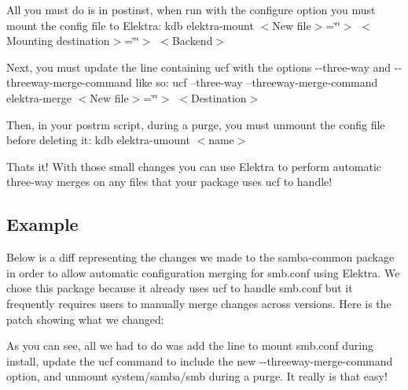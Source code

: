 All you must do is in {\ttfamily postinst}, when run with the {\ttfamily configure} option you must mount the config file to Elektra\+: kdb elektra-\/mount $<$\+New file$>$=\char`\"{}\char`\"{}$>$ $<$\+Mounting destination$>$=\char`\"{}\char`\"{}$>$ $<$\+Backend$>$

Next, you must update the line containing {\ttfamily ucf} with the options {\ttfamily -\/-\/three-\/way} and {\ttfamily -\/-\/threeway-\/merge-\/command} like so\+: ucf --three-\/way --threeway-\/merge-\/command elektra-\/merge $<$\+New file$>$=\char`\"{}\char`\"{}$>$ $<$\+Destination$>$

Then, in your {\ttfamily postrm} script, during a purge, you must unmount the config file before deleting it\+: kdb elektra-\/umount $<$name$>$

That\textquotesingle{}s it! With those small changes you can use Elektra to perform automatic three-\/way merges on any files that your package uses ucf to handle!

\subsection*{Example}

Below is a diff representing the changes we made to the samba-\/common package in order to allow automatic configuration merging for {\ttfamily smb.\+conf} using Elektra. We chose this package because it already uses ucf to handle {\ttfamily smb.\+conf} but it frequently requires users to manually merge changes across versions. Here is the patch showing what we changed\+:




As you can see, all we had to do was add the line to mount {\ttfamily smb.\+conf} during install, update the ucf command to include the new {\ttfamily -\/-\/threeway-\/merge-\/command} option, and unmount {\ttfamily system/samba/smb} during a purge. It really is that easy! 